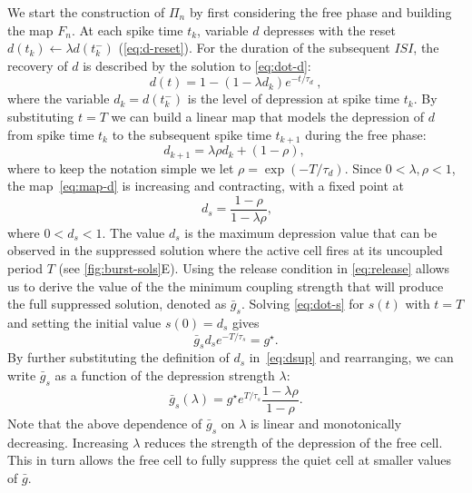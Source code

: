 \documentclass[utf8,draft]{frontiersFPHY} %
\newcommand{\gbar}{\bar g}
\begin{document}
We start the construction of $\Pi_n$ by first considering the free phase and building the map $F_n$.
At each spike time $t_{k}$, variable $d$ depresses with the reset $d(t_{k})\leftarrow \lambda d(t_{k}^{-})$ (\cref{eq:d-reset}).
For the duration of the subsequent $ISI$, the recovery of $d$ is described by the solution to \cref{eq:dot-d}:
\begin{equation}
  d(t) = 1 - (1-\lambda d_{k})e^{-t/\tau_{d}}~\label{eq:d-sol},
\end{equation}
where the variable $d_{k}=d(t^{-}_{k})$ is the level of depression at spike time $t_{k}$.
By substituting $t=T$ we can build a linear map that models the depression of $d$ from spike time $t_{k}$ to the subsequent spike time $t_{k+1}$ during the free phase:
\begin{equation}
  d_{k+1} = \lambda\rho d_{k} + (1-\rho),~\label{eq:map-d}
\end{equation}
where to keep the notation simple we let $\rho=\exp(-T/\tau_{d})$.
Since $0<\lambda, \rho<1$, the map~\eqref{eq:map-d} is increasing and contracting, with a fixed point at
\begin{equation}
 ~\label{eq:dsup}
  d_{s}=\frac{1-\rho}{1-\lambda\rho},
\end{equation}
where $0<d_{s}<1$.
The value $d_{s}$ is the maximum depression value that can be observed in the suppressed solution where the active cell fires at its uncoupled period $T$ (see \cref{fig:burst-sols}E).
Using the release condition in \cref{eq:release} allows us to derive the value of the the minimum coupling strength that will produce the full suppressed solution, denoted as $\gbar_{s}$.
Solving \cref{eq:dot-s} for $s(t)$ with $t=T$ and setting the initial value $s(0)=d_{s}$ gives
\begin{equation}
\gbar_{s} d_{s}e^{-T/\tau_{s}}=g^{\star}.
\end{equation}
By further substituting the definition of $d_{s}$ in~\eqref{eq:dsup} and rearranging, we can write $\gbar_{s}$ as a function of the depression strength $\lambda$:
\begin{equation}
  \label{eq:gs}
  \gbar_{s}(\lambda) = g^{\star}e^{T/\tau_{s}}\frac{1-\lambda \rho}{1-\rho}.
\end{equation}
Note that the above dependence of $\gbar_{s}$ on $\lambda$ is linear and monotonically decreasing.
Increasing $\lambda$ reduces the strength of the depression of the free cell.
This in turn allows the free cell to fully suppress the quiet cell at smaller values of $\gbar$.
\end{document}
